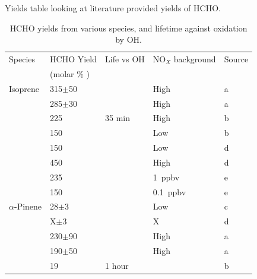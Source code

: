       
      Yields table looking at literature provided yields of HCHO.
      
      \begin{table} \begin{threeparttable}
          \caption{ HCHO yields from various species, and lifetime against oxidation by OH. }
          \begin{tabular}{  l  l  l  l  l  }
            \toprule
            Species    & HCHO Yield    & Life vs OH   & NO$_X$ background & Source   \\
            & (molar \% )   &              &                   &          \\
            \midrule 
            Isoprene	& 315$\pm$50      &            & High          & a        \\ 
            & 285$\pm$30      &            & High          & a        \\ 
            & 225             & 35 min     & High          & b        \\ %
            & 150             &            & Low           & b        \\ %
            & 150             &            & Low           & d        \\
            & 450             &            & High          & d        \\
            & 235             &            & 1~ppbv        & e        \\
            & 150             &            & 0.1~ppbv      & e        \\
            $\alpha$-Pinene & 28$\pm$3        &        & Low                & c        \\ 
            & X$\pm$3         &        & X                  & d        \\ 
            & 230$\pm$90      &        & High        & a        \\ 
            & 190$\pm$50      &        & High        & a        \\ 
            & 19              & 1 hour &              & b        \\ %

\end{tabular}
\end{threeparttable}
\end{table}

